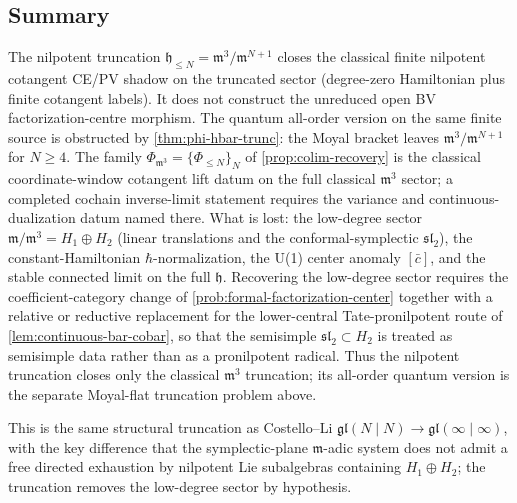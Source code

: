 \subsection*{Summary}

The nilpotent truncation
$\mathfrak h_{\leq N}=\mathfrak m^3/\mathfrak m^{N+1}$ closes
the classical finite nilpotent cotangent CE/PV shadow on the truncated
sector (degree-zero Hamiltonian plus finite cotangent labels). It does
not construct the unreduced open BV factorization-centre morphism. The quantum
all-order version on the same finite source is obstructed by
\ref{thm:phi-hbar-trunc}: the Moyal bracket leaves
$\mathfrak m^3/\mathfrak m^{N+1}$ for $N\geq4$.  The family
$\Phi_{\mathfrak m^3}=\{\Phi_{\leq N}\}_N$ of
\ref{prop:colim-recovery} is the classical coordinate-window cotangent
lift datum on the full classical $\mathfrak m^3$ sector; a completed
cochain inverse-limit statement requires the variance and
continuous-dualization datum named there. What is lost: the low-degree sector
$\mathfrak m/\mathfrak m^3=H_1\oplus H_2$ (linear translations and
the conformal-symplectic $\mathfrak{sl}_2$), the
constant-Hamiltonian $\hbar$-normalization, the U(1) center anomaly
$[\bar c]$, and the stable connected limit on the full
$\mathfrak h$. Recovering the low-degree sector requires the
coefficient-category change of
\ref{prob:formal-factorization-center} together with a
relative or reductive replacement for the lower-central
Tate-pronilpotent route of \ref{lem:continuous-bar-cobar}, so that the
semisimple $\mathfrak{sl}_2\subset H_2$ is treated as semisimple data
rather than as a pronilpotent radical. Thus the
nilpotent truncation
closes only the classical $\mathfrak m^3$ truncation; its all-order
quantum version is the separate Moyal-flat truncation problem above.

This is the same structural truncation as Costello--Li
$\mathfrak{gl}(N\mid N)\to\mathfrak{gl}(\infty\mid\infty)$, with the
key difference that the symplectic-plane $\mathfrak m$-adic system
does not admit a free directed exhaustion by nilpotent Lie
subalgebras containing $H_1\oplus H_2$; the truncation removes the
low-degree sector by hypothesis.
